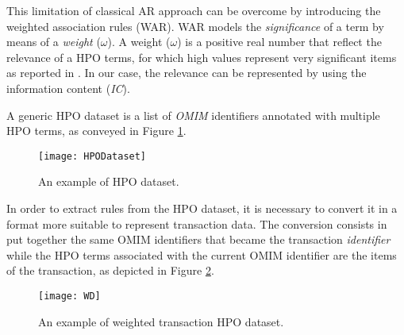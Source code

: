 \documentclass{article}
\theoremstyle{definition}
\begin{document}
This limitation of classical AR approach can be overcome by introducing the weighted association rules (WAR). WAR models the \textit{significance} of a term by means of a \textit{weight} ($\omega$). A weight ($\omega$) is a positive real number that reflect the relevance of a HPO terms,  for which high values represent very significant items as reported in \cite{Wang:2000:EMW:347090.347149, 694360}. In our case, the relevance can be represented by using the information content (\textit{IC}). %

A generic HPO dataset is a list of \textit{OMIM} identifiers annotated with multiple HPO terms, as conveyed in Figure \ref{fig:HPO_daataset}.

\begin{figure}[h]
\centering
 \texttt{[image: HPODataset]}
   \caption{An example of HPO dataset.}
\label{fig:HPO_daataset}
\end{figure}

In order to extract rules from the HPO dataset, it is necessary to convert it in a format more suitable to represent transaction data. The conversion consists in put together the same OMIM identifiers that became the transaction \textit{identifier} while the HPO terms associated with the current OMIM identifier are the items of the transaction, as depicted in Figure \ref{fig:WD}. %



 

\begin{figure}[h]
\centering
 \texttt{[image: WD]}
   \caption{An example of weighted transaction HPO dataset.}
\label{fig:WD}
\end{figure}
\end{document}
